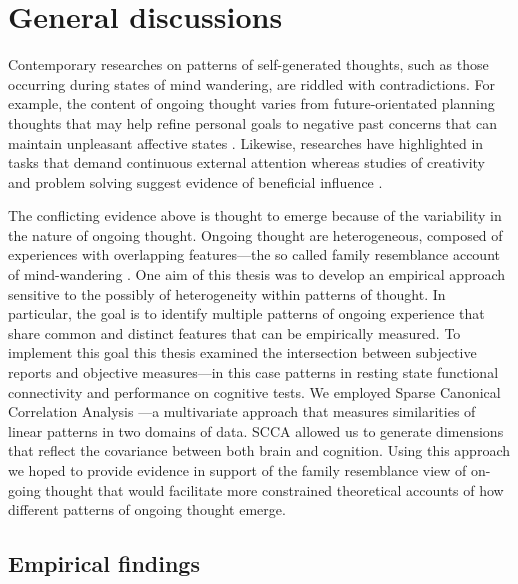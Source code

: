 \chapter{General discussions}
\label{ch:discussion}
Contemporary researches on patterns of self-generated thoughts, such as those occurring during states of mind wandering, are riddled with contradictions. For example, the content of ongoing thought varies from future-orientated planning thoughts that may help refine personal goals \cite{Medea2016} to negative past concerns that can maintain unpleasant affective states \cite{Killingsworth2010}. Likewise, researches have highlighted in tasks that demand continuous external attention \cite{McVayJOEP2009,McVay2012} whereas studies of creativity and problem solving suggest evidence of beneficial influence \cite{Smeekens2016,Baird2012}.

The conflicting evidence above is thought to emerge because of the variability in the nature of ongoing thought. Ongoing thought are heterogeneous, composed of experiences with overlapping features—the so called family resemblance account of mind-wandering \cite{Smallwood2013, Seli2018}. One aim of this thesis was to develop an empirical approach sensitive to the possibly of heterogeneity within patterns of thought. In particular, the goal is to identify multiple patterns of ongoing experience that share common and distinct features that can be empirically measured. To implement this goal this thesis examined the intersection between subjective reports and objective measures---in this case patterns in resting state functional connectivity and performance on cognitive tests. We employed Sparse Canonical Correlation Analysis \cite{WittenSCCA2009}---a multivariate approach that measures similarities of linear patterns in two domains of data. SCCA allowed us to generate dimensions that reflect the covariance between both brain and cognition. Using this approach we hoped to provide evidence in support of the family resemblance view of on-going thought that would facilitate more constrained theoretical accounts of how different patterns of ongoing thought emerge.

\section{Empirical findings}
\label{ch:discussion:results}

